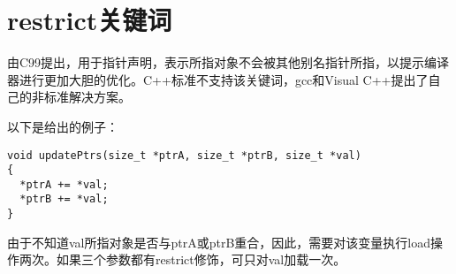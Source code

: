 \section{restrict关键词}
由C99提出，用于指针声明，表示所指对象不会被其他别名指针所指，以提示编译器进行更加大胆的优化。C++标准不支持该关键词，gcc和Visual C++提出了自己的非标准解决方案。

以下是\cite{wikipedia}给出的例子：

\begin{lstlisting}
void updatePtrs(size_t *ptrA, size_t *ptrB, size_t *val)
{
  *ptrA += *val;
  *ptrB += *val;
}
\end{lstlisting}

由于不知道val所指对象是否与ptrA或ptrB重合，因此，需要对该变量执行load操作两次。如果三个参数都有restrict修饰，可只对val加载一次。

